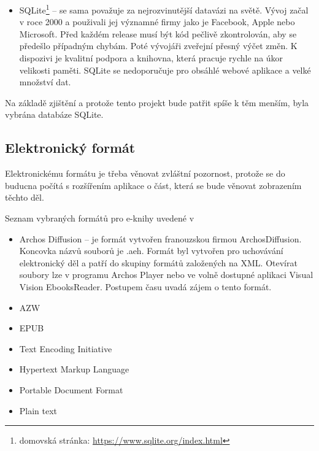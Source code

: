 \begin{itemize}
                \item SQLite\footnote{domovská stránka: \url{https://www.sqlite.org/index.html}} – se sama považuje za nejrozvinutější datavázi na světě. Vývoj začal v roce 2000 a použivali jej významné firmy jako je Facebook, Apple nebo Microsoft. Před každém release musí být kód pečlivě zkontrolován, aby se předešlo případným chybám. Poté vývojáři zveřejní přesný výčet změn. K dispozivi je kvalitní podpora a knihovna, která pracuje rychle na úkor velikosti paměti. SQLite se nedoporučuje pro obsáhlé webové aplikace a velké množství dat.
        \end{itemize}
        
        Na základě zjištění a protože tento projekt bude patřit spíše k těm menším, byla vybrána databáze SQLite.
        
        \subsection{Elektronický formát}
            \cite{electronic-format}
            
            Elektronickému formátu je třeba věnovat zvláštní pozornost, protože se do buducna počítá s rozšířením aplikace o část, která se bude věnovat zobrazením těchto děl.
            
            Seznam vybraných formátů pro e-knihy uvedené v \cite{electronic-format}
            
            \begin{itemize}
                \item Archos Diffusion – je formát vytvořen franouzskou firmou  ArchosDiffusion. Koncovka názvů souborů je .aeh. Formát byl vytvořen pro uchovávání elektronický děl a patří do skupiny formátů založených na XML. Otevírat soubory lze v programu Archos Player nebo ve volně dostupné aplikaci Visual Vision EbooksReader. Postupem času uvadá zájem o tento formát.
                \item AZW
                \item EPUB
                \item Text Encoding Initiative
                \item Hypertext Markup Language
                \item Portable Document Format
                \item Plain text
            \end{itemize}
            
